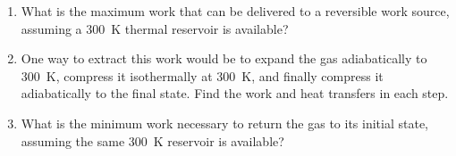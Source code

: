\documentclass[11pt]{article}
\begin{document}
\begin{enumerate}
\item What is the maximum work that can be delivered to a reversible work
source, assuming a \SI{300}{K} thermal reservoir is available?

\item One way to extract this work would be to expand the gas adiabatically to
\SI{300}{K}, compress it isothermally at \SI{300}{K}, and finally compress it
adiabatically to the final state.  Find the work and heat transfers in each step.

\item What is the minimum work necessary to return the gas to its initial
state, assuming the same \SI{300}{K} reservoir is available?
\end{enumerate}
\end{document}
